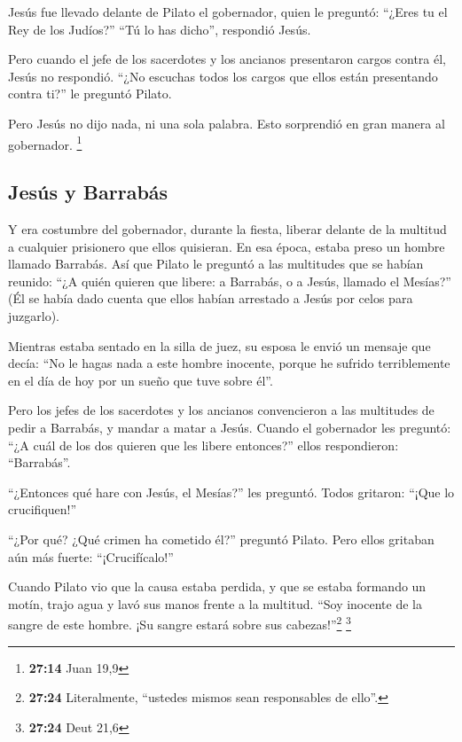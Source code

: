  Jesús fue llevado delante de Pilato el gobernador, quien
le preguntó: ``¿Eres tu el Rey de los Judíos?'' ``Tú lo has dicho'',
respondió Jesús.

 Pero cuando el jefe de los sacerdotes y los ancianos
presentaron cargos contra él, Jesús no respondió.  ``¿No
escuchas todos los cargos que ellos están presentando contra ti?'' le
preguntó Pilato.

 Pero Jesús no dijo nada, ni una sola palabra. Esto
sorprendió en gran manera al gobernador. \footnote{\textbf{27:14} Juan
  19,9}

\hypertarget{jesuxfas-y-barrabuxe1s}{%
\subsection{Jesús y Barrabás}\label{jesuxfas-y-barrabuxe1s}}

 Y era costumbre del gobernador, durante la fiesta,
liberar delante de la multitud a cualquier prisionero que ellos
quisieran.  En esa época, estaba preso un hombre llamado
Barrabás.  Así que Pilato le preguntó a las multitudes
que se habían reunido: ``¿A quién quieren que libere: a Barrabás, o a
Jesús, llamado el Mesías?''  (Él se había dado cuenta que
ellos habían arrestado a Jesús por celos para juzgarlo).

 Mientras estaba sentado en la silla de juez, su esposa
le envió un mensaje que decía: ``No le hagas nada a este hombre
inocente, porque he sufrido terriblemente en el día de hoy por un sueño
que tuve sobre él''.

 Pero los jefes de los sacerdotes y los ancianos
convencieron a las multitudes de pedir a Barrabás, y mandar a matar a
Jesús.  Cuando el gobernador les preguntó: ``¿A cuál de
los dos quieren que les libere entonces?'' ellos respondieron:
``Barrabás''.

 ``¿Entonces qué hare con Jesús, el Mesías?'' les
preguntó. Todos gritaron: ``¡Que lo crucifiquen!''

 ``¿Por qué? ¿Qué crimen ha cometido él?'' preguntó
Pilato. Pero ellos gritaban aún más fuerte: ``¡Crucifícalo!''

 Cuando Pilato vio que la causa estaba perdida, y que se
estaba formando un motín, trajo agua y lavó sus manos frente a la
multitud. ``Soy inocente de la sangre de este hombre. ¡Su sangre estará
sobre sus cabezas!''\footnote{\textbf{27:24} Literalmente, ``ustedes
  mismos sean responsables de ello''.} \footnote{\textbf{27:24} Deut
  21,6}

